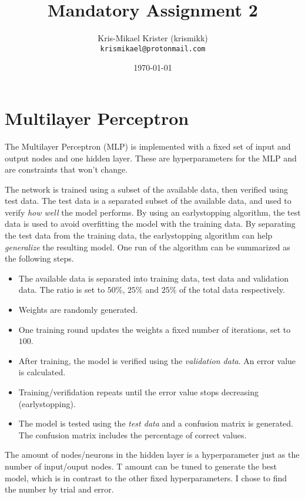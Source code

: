 \documentclass{article}
\title{Mandatory Assignment 2}
\author{Kris-Mikael Krister (krismikk)\\\texttt{krismikael@protonmail.com}}
\date{\today}
\begin{document}
\maketitle

\section*{Multilayer Perceptron}

The Multilayer Perceptron (MLP) is implemented with a fixed set of input and output nodes and one hidden layer. These are hyperparameters for the MLP and are constraints that won't change.

The network is trained using a subset of the available data, then verified using test data. The test data is a separated subset of the available data, and used to verify \emph{how well} the model performs. By using an earlystopping algorithm, the test data is used to avoid overfitting the model with the training data. By separating the test data from the training data, the earlystopping algorithm can help \emph{generalize} the resulting model. One run of the algorithm can be summarized as the following steps.

\begin{itemize}
    \item The available data is separated into training data, test data and validation data. The ratio is set to $50\%$, $25\%$ and $25\%$ of the total data respectively.
    \item Weights are randomly generated.
    \item One training round updates the weights a fixed number of iterations, set to $100$.
    \item After training, the model is verified using the \emph{validation data}. An error value is calculated.
    \item Training/verifidation repeats until the error value stops decreasing (earlystopping).
    \item The model is tested using the \emph{test data} and a confusion matrix is generated. The confusion matrix includes the percentage of correct values.
\end{itemize}

\noindent The amount of nodes/neurons in the hidden layer is a hyperparameter just as the number of input/ouput nodes. T amount can be tuned to generate the best model, which is in contrast to the other fixed hyperparameters. I chose to find the number by trial and error.
\end{document}
